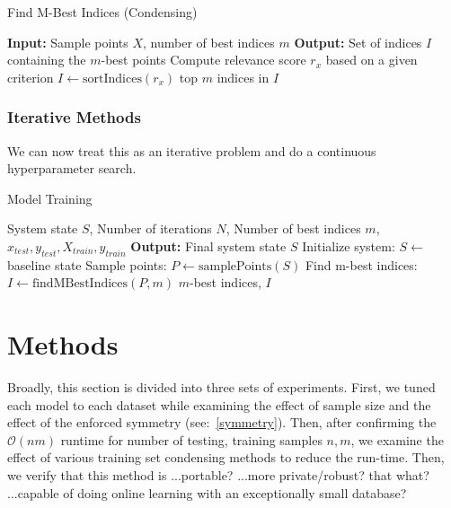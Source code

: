 \documentclass[conference]{IEEEtran}
\begin{document}
\begin{algorithm}
  \caption{Find M-Best Indices (Condensing)}
  \label{alg:m-best-indices}
  \begin{algorithmic}
    \State \textbf{Input:} Sample points $X$, number of best indices $m$
    \State \textbf{Output:} Set of indices $I$ containing the $m$-best points
      \State Compute relevance score $r_x$ based on a given criterion
    \State $I \gets \text{sortIndices}(r_x)$
    \State \Return top $m$ indices in $I$
  \end{algorithmic}
\end{algorithm}


\subsubsection{Iterative Methods}
We can now treat this as an iterative problem and do a continuous hyperparameter search.


\begin{algorithm}
  \caption{Model Training}
  \label{alg:condensing}
  \begin{algorithmic}
    \Require System state $S$, Number of iterations $N$, Number of best indices $m$, $x_{test}, y_{test}, X_{train}, y_{train}$
    \State \textbf{Output:} Final system state $S$
    \State Initialize system: $S \gets$ baseline state
      \State Sample points: $P \gets \text{samplePoints}(S)$
      \State Find m-best indices: $I \gets \text{findMBestIndices}(P, m)$
    \State \Return $m$-best indices, $I$
  \end{algorithmic}
\end{algorithm}






\section{Methods}
Broadly, this section is divided into three sets of experiments. First, we tuned each model to each dataset while examining the effect of sample size and the effect of the enforced symmetry (see:~\ref{symmetry}). Then, after confirming the $\mathcal{O}(nm)$ runtime for number of testing, training samples $n,m$, we examine the effect of various training set condensing methods to reduce the run-time. Then, we verify that this method is ...portable?
...more private/robust? that what?
...capable of doing online learning with an exceptionally small database?
\end{document}
